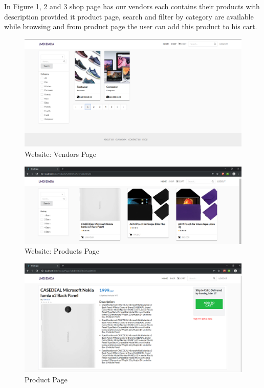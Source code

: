 In Figure \ref{fig: vendors}, \ref{fig: products} and \ref{fig: product Page} shop page has our vendors each contains their products with description provided it product page, search and filter by category are available while browsing and from product page the user can add this product to his cart.

  \begin{figure}[htp]%
    \center%
    \includegraphics[width=1\textwidth]{images/Software/vendors.PNG}%
    \caption[Website: Vendors Page]{Website: Vendors Page}\label{fig: vendors}%
  \end{figure}
  
  \begin{figure}[htp]%
    \center%
    \includegraphics[width=1\textwidth]{images/Software/products.PNG}%
    \caption[Website: Products Page]{Website: Products Page}\label{fig: products}%
  \end{figure}\newline
  
    \begin{figure}[htp]%
    \center%
    \includegraphics[width=1\textwidth]{images/Software/productPage.PNG}%
    \caption[Website: product Page]{Product Page}\label{fig: product Page}%
  \end{figure}\newpage
  

